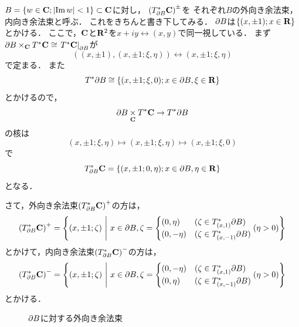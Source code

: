 \begin{EG}
  \(B=\left\{
      w\in\cc;\lvert{\Img{w}}\rvert<1
    \right\}\subset\cc
  \)に対し，
  \(\left(T^{\ast}_{\bd{B}}\cc\right)^{\pm}\)を
  それぞれ\(B\)の外向き余法束，内向き余法束と呼ぶ．
  これをきちんと書き下してみる．
  \(\bd{B}\)は\(\left\{(x,\pm1);x\in\rr\right\}\)とかける．
  ここで，\(\cc\)と\(\rr^2\)を\(
    x+iy\leftrightarrow (x,y)
  \)で同一視している．
  まず\(
    \bd{B}\times_{\cc}T^{\ast}\cc
    \cong\mres[T^{\ast}\cc]{\bd{B}}
  \)が\[
    \left((x,\pm1),(x,\pm1;\xi,\eta)\right)
    \longleftrightarrow
    \left(x,\pm1;\xi,\eta\right)
  \]で定まる．
  また\[
    T^{\ast}\bd{B}
    \cong
    \left\{(x,\pm1;\xi,0);x\in\bd{B},\xi\in\rr\right\}
  \]とかけるので，
  \[
    \bd{B}\pb[\cc]T^{\ast}\cc\to T^{\ast}\bd{B}
  \]
  の核は\[
    (x,\pm1;\xi,\eta)\mapsto(x,\pm1;\xi,\eta)\mapsto(x,\pm1;\xi,0)
  \]で\[
    T^{\ast}_{\bd{B}}\cc=
    \left\{(x,\pm1;0,\eta);x\in\bd{B},\eta\in\rr\right\}
  \]となる．

  さて，外向き余法束\(
    \left(T^{\ast}_{\bd{B}}\cc\right)^{+}
  \)の方は，\[
    \left(T^{\ast}_{\bd{B}}\cc\right)^{+}
    =
    \left\{(x,\pm1;\zeta)~\middle|~x\in\bd{B},
    \zeta=\begin{cases}
      (0,\eta)&(\zeta\in T^{\ast}_{(x,1)}\bd{B})\\
      (0,-\eta)&(\zeta\in T^{\ast}_{(x,-1)}\bd{B})
    \end{cases}(\eta>0)\right\}
  \]
  とかけて，内向き余法束\(
    \left(T^{\ast}_{\bd{B}}\cc\right)^{-}
  \)の方は，\[
    \left(T^{\ast}_{\bd{B}}\cc\right)^{-}=
    \left\{(x,\pm1;\zeta)~\middle|~x\in\bd{B},
    \zeta=\begin{cases}
      (0,-\eta)&(\zeta\in T^{\ast}_{(x,1)}\bd{B})\\
      (0,\eta)&(\zeta\in T^{\ast}_{(x,-1)}\bd{B})
    \end{cases}(\eta>0)\right\}
  \]
  とかける．

  \begin{figure}[htb]
    \centering
    \caption{\(\bd{B}\)に対する外向き余法束}
    \label{fig:conormal}
  \end{figure}
\end{EG}

